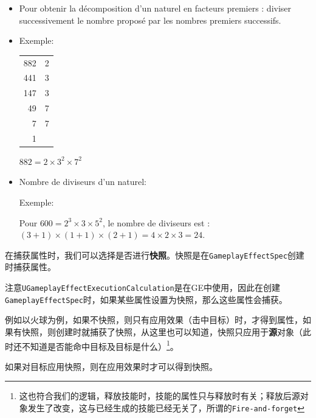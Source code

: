 \documentclass[10pt,a4paper,x11names,dvipsnames,svgnames,oneside]{ctexbook}
\begin{document}
	\begin{pr}
	\begin{itemize}
		\item Pour obtenir la décomposition d'un naturel en facteurs premiers : diviser successivement le nombre proposé par les nombres premiers successifs. 
		\item Exemple:
		\begin{center}
			\begin{tabular}{r|l}
				882&2\\
				441&3\\
				147&3\\
				49&7\\
				7&7\\
				1&\\
			\end{tabular}
			\qquad\qquad $882 = 2 \times 3^2 \times 7^2$ 
		\end{center}
		\item Nombre de diviseurs d'un naturel:
		
		Exemple:  
		
		Pour $600=2^3\times 3\times 5^2$, le nombre de diviseurs est :
		$(3+1)\times (1+1)\times (2+1)=4\times 2\times 3 = 24$.
	\end{itemize}
\end{pr}
在捕获属性时，我们可以选择是否进行\textbf{快照}。快照是在\texttt{GameplayEffectSpec}创建时捕获属性。

注意\texttt{UGameplayEffectExecutionCalculation}是在GE中使用，因此在创建\texttt{GameplayEffectSpec}时，如果某些属性设置为快照，那么这些属性会捕获。

例如以火球为例，如果不快照，则只有应用效果（击中目标）时，才得到属性，如果有快照，则创建时就捕获了快照，从这里也可以知道，快照只应用于\textbf{源}对象（此时还不知道是否能命中目标及目标是什么）\footnote{这也符合我们的逻辑，释放技能时，技能的属性只与释放时有关；释放后源对象发生了改变，这与已经生成的技能已经无关了，所谓的\texttt{Fire-and-forget}}。

如果对目标应用快照，则在应用效果时才可以得到快照。
\end{document}
